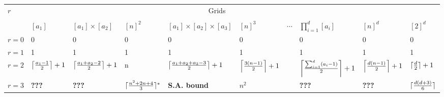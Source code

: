 \documentclass[varwidth=\maxdimen]{standalone}
\DeclarePairedDelimiter\ceil{\lceil}{\rceil}
\begin{document}
%
\normalsize%
\begin{table}[h]
    \centering
    \begin{tabular}{l l l l l l l l l l}
        \toprule
        \multirow{2}{*}[-1em]{$r$} & \multicolumn{8}{c}{Grids} \\
        \cmidrule(lr){2-10} \\
        {} & $[a_1]$ & $[a_1] \times [a_2]$ & $[n]^2$ & $[a_1] \times [a_2] \times [a_3]$ & $[n]^3$ & $\cdots$ & $\prod_{i=1}^d[a_i]$ & $[n]^d$ & $[2]^d$\\
        \midrule
        $r=0$ & 0  & $0$ & 0  & 0 & 0 &  & 0 & 0 & 0 \\
        $r=1$ & 1 & 1 & 1 & 1 & 1 &  & 1 & 1 & 1 \\
        $r=2$ & $\ceil*{\frac{a_1-1}{2}}+1$ & $\ceil*{\frac{a_1+a_2-2}{2}}+1$ & n & $\ceil*{\frac{a_1+a_2+a_3-3}{2}}+1$ & $\ceil*{\frac{3(n-1)}{2}}+1$ &  & $\ceil*{\frac{\sum_{i=1}^d (a_i-1)}{2}}+1$ & $\ceil*{\frac{d(n-1)}{2}}+1$ & $\ceil{\frac{d}{2}}+1$\\
        $r=3$ & \textbf{???} & \textbf{???} & $\ceil{\frac{n^2+2n+4}{3}}^*$ & \textbf{S.A. bound} & $n^2$ &  & \textbf{???} & \textbf{???} & $\ceil{\frac{d(d+3)}{6}}$\\
        \bottomrule
    \end{tabular}
\end{table}
\end{document}
